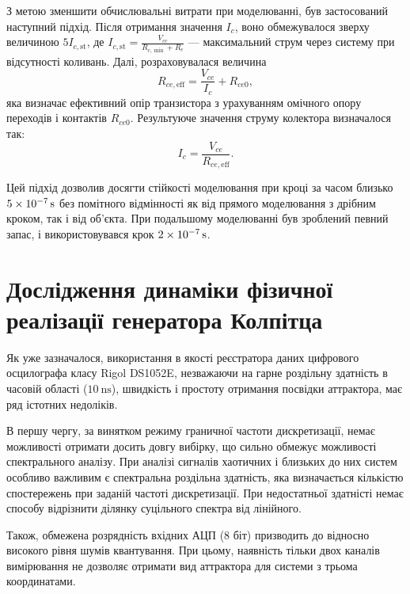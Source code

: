 З метою зменшити обчислювальні витрати при моделюванні, був
застосований наступний підхід. Після отримання значення
$ I_c $, воно обмежувалося зверху величиною
$ 5 I_{c,\mathrm{st}}$,
де
$ I_{c,\mathrm{st}} = \frac{V_{cc}}{R_{c,{\min}}+R_e}$ ---
максимальний струм через систему при відсутності коливань. Далі,
розраховувалася величина
%
\[
  R_{ce,\mathrm{eff}} = \frac{V_{ce}}{I_c} + R_{ce0},
\]
яка визначає ефективний опір транзистора з урахуванням омічного
опору переходів і контактів
$ R_{ce0} $. Результуюче значення струму колектора визначалося так:
%
\[
  I_c = \frac{V_{ce}}{R_{ce,\mathrm{eff}}}.
\]

Цей підхід дозволив досягти стійкості моделювання при кроці
за часом близько
$ \SI{5E-7}{\second} $ без помітного відмінності як від прямого
моделювання з дрібним кроком, так і від об'єкта. При подальшому
моделюванні був зроблений певний запас, і використовувався крок
$ \SI{2E-7}{\second} $.




\section{Дослідження динаміки фізичної реалізації генератора Колпітца} %

Як уже зазначалося, використання в якості реєстратора даних
цифрового осцилографа класу Rigol DS1052E, незважаючи на гарне роздільну здатність
в часовій області ($ \SI{10}{\nano \second} $), швидкість і простоту отримання посвідки
аттрактора, має ряд істотних недоліків.

В першу чергу, за винятком режиму граничної частоти
дискретизації, немає можливості отримати досить довгу вибірку,
що сильно обмежує можливості спектрального аналізу. При аналізі
сигналів хаотичних і близьких до них систем особливо важливим
є спектральна роздільна здатність, яка визначається кількістю спостережень
при заданій частоті дискретизації. При недостатньої здатністі
немає способу відрізнити ділянку суцільного спектра від
лінійного.

Також, обмежена розрядність вхідних АЦП (8 біт) призводить до
відносно високого рівня шумів квантування. При цьому, наявність
тільки двох каналів вимірювання не дозволяє отримати вид
аттрактора для системи з трьома координатами.

